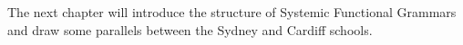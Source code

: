     
    The next chapter will introduce the structure of Systemic Functional Grammars and draw some parallels between the Sydney and Cardiff schools. 

 
